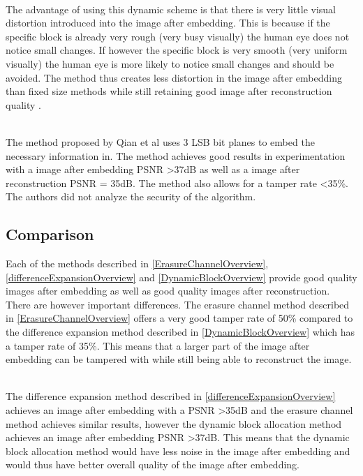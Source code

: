 \documentclass[12pt]{article}
\begin{document}
\hspace{0pt} \\
The advantage of using this dynamic scheme is that there is very little visual distortion introduced into the image after embedding. 
This is because if the specific block is already very rough (very busy visually) the human eye does not notice small changes.
If however the specific block is very smooth (very uniform visually) the human eye is more likely to notice small changes and should be avoided.
The method thus creates less distortion in the image after embedding than fixed size methods while still retaining good image after reconstruction quality \cite{qian2011image}. 

\hspace{0pt} \\
The method proposed by Qian et al \cite{qian2011image} uses 3 LSB bit planes
to embed the necessary information in.
The method achieves good results in experimentation with a image after embedding PSNR \textgreater 37dB as well as a image after reconstruction PSNR = 35dB.
The method also allows for a tamper rate \textless 35\%.
The authors did not analyze the security of the algorithm.

\subsection{Comparison}
\label{litStudyCamparison}
Each of the methods described in \ref{ErasureChannelOverview}, \ref{differenceExpansionOverview} and \ref{DynamicBlockOverview} provide good quality images after embedding as well as good quality images after reconstruction.
There are however important differences.
The erasure channel method described in \ref{ErasureChannelOverview} offers a very good tamper rate of 50\% compared to the difference expansion method described in \ref{DynamicBlockOverview} which has a tamper rate of 35\%.
This means that a larger part of the image after embedding can be tampered with while still being able to reconstruct the image.

\hspace{0pt} \\
The difference expansion method described in \ref{differenceExpansionOverview} achieves an image after embedding with a PSNR \textgreater 35dB and the erasure channel method achieves similar results, however the dynamic block allocation method achieves an image after embedding PSNR \textgreater 37dB.
This means that the dynamic block allocation method would have less noise in the image after embedding and would thus have better overall quality of the image after embedding.
\end{document}
